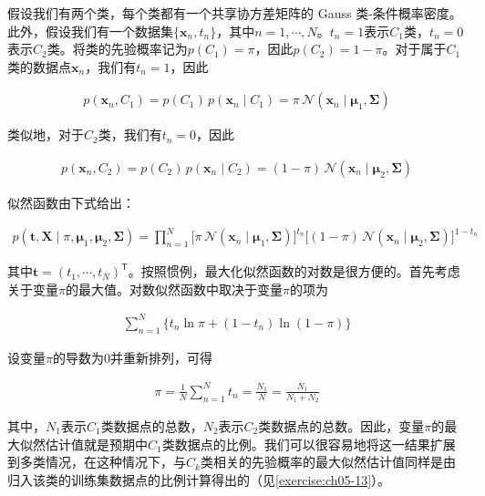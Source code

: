 \documentclass[../../main.tex]{subfiles}
\begin{document}
假设我们有两个类，每个类都有一个共享协方差矩阵的 Gauss 类-条件概率密度。此外，假设我们有一个数据集$\{\boldsymbol{x}_n,t_n\}$，其中$n=1,\cdots,N$。$t_n=1$表示$C_1$类，$t_n=0$表示$C_2$类。将类的先验概率记为$p(C_1)=\pi$，因此$p(C_2)=1-\pi$。对于属于$C_1$类的数据点$\boldsymbol{x}_n$，我们有$t_n=1$，因此

\begin{align}
  p(\boldsymbol{x}_n,C_1)=p(C_1)\,p(\boldsymbol{x}_n\mid C_1)=\pi\,\mathcal{N}(\boldsymbol{x}_n\mid\boldsymbol{\mu}_1,\boldsymbol{\Sigma})
\end{align}

类似地，对于$C_2$类，我们有$t_n=0$，因此

\begin{align}
  p(\boldsymbol{x}_n,C_2)=p(C_2)\,p(\boldsymbol{x}_n\mid C_2)=(1-\pi)\,\mathcal{N}(\boldsymbol{x}_n\mid\boldsymbol{\mu}_2,\boldsymbol{\Sigma})
\end{align}

似然函数由下式给出：

\begin{align}
  p(\boldsymbol{t},\boldsymbol{X}\mid\pi,\boldsymbol{\mu}_1,\boldsymbol{\mu}_2,\boldsymbol{\Sigma})=\prod_{n=1}^{N}\bigl[\pi\,\mathcal{N}(\boldsymbol{x}_n\mid\boldsymbol{\mu}_1,\boldsymbol{\Sigma})\bigr]^{t_n}\bigl[(1-\pi)\,\mathcal{N}(\boldsymbol{x}_n\mid\boldsymbol{\mu}_2,\boldsymbol{\Sigma})\bigr]^{1-t_n}
  \label{align:ch05-生成似然}
\end{align}

其中$\boldsymbol{t}=(t_1,\cdots,t_N)^{\mathsf{T}}$。按照惯例，最大化似然函数的对数是很方便的。首先考虑关于变量$\pi$的最大值。对数似然函数中取决于变量$\pi$的项为

\begin{align}
  \sum_{n=1}^{N}\bigl\{t_n\ln\pi+(1-t_n)\ln(1-\pi)\bigr\}
  \label{align:ch05-先验项}
\end{align}

设变量$\pi$的导数为0并重新排列，可得

\begin{align}
  \pi=\frac{1}{N}\sum_{n=1}^{N}t_n=\frac{N_1}{N}=\frac{N_1}{N_1+N_2}
  \label{align:ch05-先验ML}
\end{align}

其中，$N_1$表示$C_1$类数据点的总数，$N_2$表示$C_2$类数据点的总数。因此，变量$\pi$的最大似然估计值就是预期中$C_1$类数据点的比例。我们可以很容易地将这一结果扩展到多类情况，在这种情况下，与$C_k$类相关的先验概率的最大似然估计值同样是由归入该类的训练集数据点的比例计算得出的（见\cref{exercise:ch05-13}）。
\end{document}
